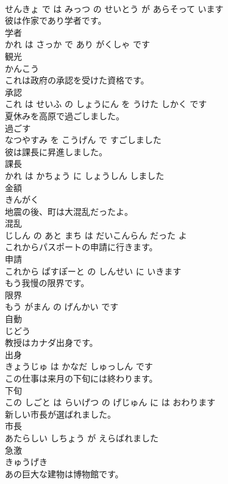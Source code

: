\documentclass[8pt]{extreport}
\begin{document}
\begin{CJK}{UTF8}{min}
\\	せんきょ で は みっつ の せいとう が あらそって います		
\\	彼は作家であり学者です。	
\\	学者 
\\	かれ は さっか で あり がくしゃ です		
\\	観光	
\\	かんこう		
\\	これは政府の承認を受けた資格です。	
\\	承認 
\\	これ は せいふ の しょうにん を うけた しかく です		
\\	夏休みを高原で過ごしました。	
\\	過ごす 
\\	なつやすみ を こうげん で すごしました		
\\	彼は課長に昇進しました。	
\\	課長 
\\	かれ は かちょう に しょうしん しました		
\\	金額	
\\	きんがく		
\\	地震の後、町は大混乱だったよ。	
\\	混乱 
\\	じしん の あと まち は だいこんらん だった よ		
\\	これからパスポートの申請に行きます。	
\\	申請 
\\	これから ぱすぽーと の しんせい に いきます		
\\	もう我慢の限界です。	
\\	限界 
\\	もう がまん の げんかい です		
\\	自動	
\\	じどう		
\\	教授はカナダ出身です。	
\\	出身 
\\	きょうじゅ は かなだ しゅっしん です		
\\	この仕事は来月の下旬には終わります。	
\\	下旬 
\\	この しごと は らいげつ の げじゅん に は おわります		
\\	新しい市長が選ばれました。	
\\	市長 
\\	あたらしい しちょう が えらばれました		
\\	急激	
\\	きゅうげき		
\\	あの巨大な建物は博物館です。	

\end{CJK}
\end{document}
